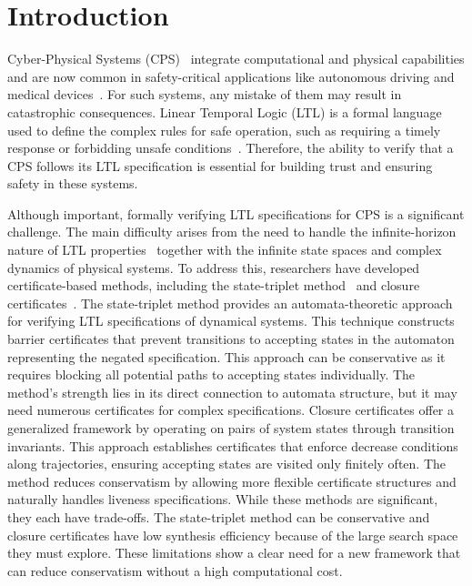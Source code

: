 \section{Introduction}
Cyber-Physical Systems (CPS)~\cite{baheti2011cyber} integrate computational and physical capabilities and are now common in safety-critical applications like autonomous driving and medical devices~\cite{rajkumar2010cyber}. For such systems, any mistake of them may result in catastrophic consequences. Linear Temporal Logic (LTL) is a formal language used to define the complex rules for safe operation, such as requiring a timely response or forbidding unsafe conditions~\cite{pnueli1977temporal}. Therefore, the ability to verify that a CPS follows its LTL specification is essential for building trust and ensuring safety in these systems.

Although important, formally verifying LTL specifications for CPS is a significant challenge. The main difficulty arises from the need to handle the infinite-horizon nature of LTL properties~\cite{baier2008principles} together with the infinite state spaces and complex dynamics of physical systems. To address this, researchers have developed certificate-based methods, including the state-triplet method~\cite{wongpiromsarn2015automata} and closure certificates~\cite{murali2024closure}. The state-triplet method provides an automata-theoretic approach for verifying LTL specifications of dynamical systems. This technique constructs barrier certificates that prevent transitions to accepting states in the automaton representing the negated specification. This approach can be conservative as it requires blocking all potential paths to accepting states individually. The method's strength lies in its direct connection to automata structure, but it may need numerous certificates for complex specifications. Closure certificates offer a generalized framework by operating on pairs of system states through transition invariants. This approach establishes certificates that enforce decrease conditions along trajectories, ensuring accepting states are visited only finitely often. The method reduces conservatism by allowing more flexible certificate structures and naturally handles liveness specifications. While these methods are significant, they each have trade-offs. The state-triplet method can be conservative and closure certificates have low synthesis efficiency because of the large search space they must explore. These limitations show a clear need for a new framework that can reduce conservatism without a high computational cost.


